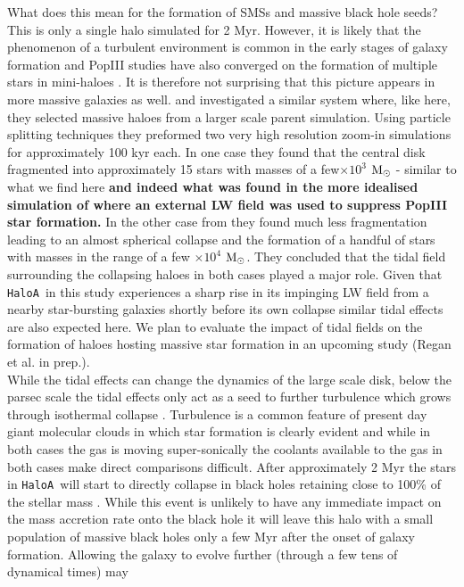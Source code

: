 \documentclass[twocolumn,iop,revtex4]{openjournal}
\newcommand{\msolar} {$\rm{M_{\odot}}~$}
\newcommand{\msolarc} {$\rm{M_{\odot}}$}
\newcommand{\ha} {\texttt{HaloA~}}
\begin{document}
\indent What does this mean for the formation of SMSs and massive black hole seeds? This is only a
single halo simulated for 2 Myr. However, it is likely that the phenomenon of a
turbulent environment is common in the early stages of galaxy formation and
PopIII studies have also converged on the formation of multiple stars in mini-haloes
\citep[e.g.][]{Turk_2012}. It is therefore not surprising that this picture appears in
more massive galaxies as well. \cite{Chon_2016} and \cite{Chon_2017b} investigated a similar system
where, like here, they selected massive haloes from a larger scale parent simulation. Using
particle splitting techniques they preformed two very high resolution zoom-in simulations for
approximately 100 kyr each. In one case they found that the central disk fragmented into approximately
15 stars with masses of a few$\times 10^3$ \msolar - similar to what we find here
\textbf{and indeed what was found in the more idealised simulation of \cite{Regan_2018b} where an external LW field was used to suppress PopIII star formation.} In the
other case from \cite{Chon_2017b} they found much less fragmentation leading to an almost spherical collapse and the
formation of a handful of stars with masses in the range of a few $\times 10^4$ \msolarc.
They concluded that the tidal field surrounding the collapsing haloes in both cases played a major
role. Given that \ha in this study experiences a sharp rise in its impinging LW field from a
nearby star-bursting galaxies shortly before its own collapse similar tidal effects are also expected
here. We plan to evaluate the impact of tidal fields on the formation of haloes hosting massive
star formation in an upcoming study (Regan et al. in prep.). \\
\indent While the tidal effects can change the dynamics of the large scale disk, below the parsec
scale the tidal effects only act as a seed to further turbulence which grows through isothermal
collapse \citep{Chon_2017b}.
Turbulence is a common feature of present day giant molecular clouds in
which star formation is clearly evident \citep[e.g.][]{Girichidis_2020, Lee_2020, Krause_2020}
and while in both cases the gas is moving super-sonically the coolants available to the gas in both
cases make direct comparisons difficult. 
After approximately 2 Myr the stars in \ha will start to directly
collapse in black holes retaining close to 100\% of the stellar mass \citep{Heger_2003}. While this
event is unlikely to have any immediate impact on the mass accretion rate onto the black hole it will
leave this halo with a small population of massive black holes only a few Myr after the onset of galaxy formation. Allowing the galaxy to evolve further  (through a few tens of dynamical times) may
\end{document}
